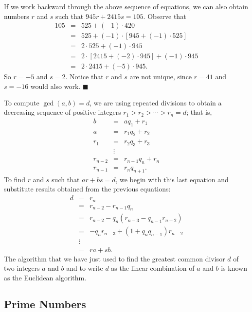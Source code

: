 If we work backward through the above sequence of equations, we can also obtain numbers $r$ and $s$ such that $945 r + 2415 s = 105$.  Observe that 
\begin{eqnarray*}
105 & = & 525 + (-1) \cdot 420 \\
& = & 525 + (-1) \cdot [945 + (-1) \cdot 525] \\
& = & 2 \cdot 525 + (-1) \cdot 945 \\
& = & 2 \cdot [2415 + (-2) \cdot 945] + (-1) \cdot 945 \\
& = & 2 \cdot 2415 + (-5) \cdot 945.
\end{eqnarray*}
So $r = -5$ and $s= 2$.  Notice that $r$ and $s$ are not unique, since $r = 41$ and $s = -16$ would also work.
\hspace{\fill} $\blacksquare$

\medskip

To compute $\gcd(a,b) = d$, we are using repeated divisions to obtain a decreasing sequence of positive integers $r_1 > r_2 > \cdots > r_n = d$; that is,
\begin{eqnarray*}
b & = & a q_1 + r_1 \\
a & = & r_1 q_2 + r_2 \\
r_1 & = & r_2 q_3 + r_3 \\
& \vdots & \\
r_{n - 2} & = & r_{n - 1} q_{n} + r_{n} \\
r_{n - 1} & = & r_n q_{n + 1}.
\end{eqnarray*}
To find $r$ and $s$ such that $ar + bs = d$, we begin with this last equation and substitute results obtained from the previous equations:
\begin{eqnarray*}
d & = & r_n \\
& = & r_{n - 2} - r_{n - 1} q_n \\
& = & r_{n - 2} - q_n( r_{n - 3} - q_{n - 1} r_{n - 2} ) \\
& = & -q_n r_{n - 3} + ( 1+ q_n q_{n-1} ) r_{n - 2}  \\
& \vdots & \\
& = & ra + sb.
\end{eqnarray*}
The algorithm that we have just used to find the greatest common divisor $d$ of two integers $a$ and $b$ and to write $d$ as the linear combination of $a$ and $b$ is known as the {\bfi Euclidean algorithm}.  
 
 
\subsection*{Prime Numbers}

